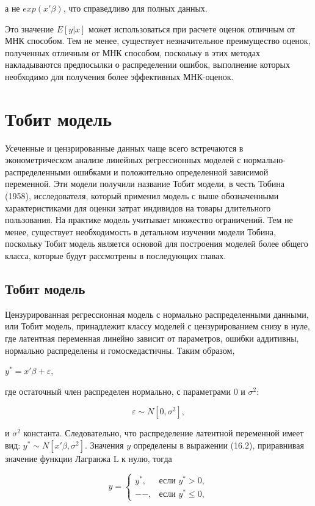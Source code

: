 а не $exp(x'\beta)$, что справедливо для полных данных.

Это значение $E[y|x]$ может использоваться при расчете оценок отличным от МНК способом. Тем не менее, существует незначительное преимущество оценок, полученных отличным от МНК способом, поскольку в этих методах накладываются предпосылки о распределении ошибок, выполнение которых необходимо для получения более эффективных МНК-оценок.

\section{Тобит модель}

Усеченные и цензрированные данных чаще всего встречаются в эконометрическом анализе линейных регрессионных моделей с нормально-распределенными ошибками и положительно определенной зависимой переменной. Эти модели получили название Тобит модели, в честь Тобина (1958), исследователя, который применил модель с выше обозначенными характеристиками для оценки затрат индивидов на товары длительного пользования. На практике модель учитывает множество ограничений. Тем не менее, существует необходимость в детальном изучении модели Тобина, поскольку Тобит модель является основой для построения моделей более общего класса, которые будут рассмотрены в последующих главах.

\subsection{Тобит модель}

Цензурированная регрессионная модель с нормально распределенными данными, или Тобит модель, принадлежит классу моделей с цензурированием снизу в нуле, где латентная переменная линейно зависит от параметров, ошибки аддитивны, нормально распределены и гомоскедастичны. Таким образом, 

$y^{*}=x'\beta+\varepsilon$,

где остаточный член распределен нормально, с параметрами $0$ и $\sigma^2$:

\[
\varepsilon{\sim}N[0,\sigma^2],
\]

и $\sigma^2$ константа. Следовательно, что распределение латентной переменной имеет вид: $y^{*}{\sim}N[x'\beta,\sigma^2]$. Значения $y$ определены в выражении (16.2), приравнивая значение функции Лагранжа L к нулю, тогда 

\begin{equation}
y=
\begin{cases}
y^{*}, &\text{если $y^{*}>0$}, \\
--, & \text{если $y^{*}{\leq}0$},
\end{cases}
\end{equation}

